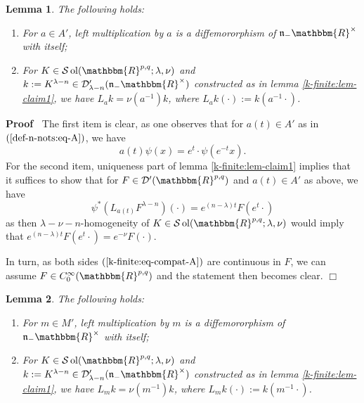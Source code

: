 \documentclass{article}
\newcommand{\assign}{:=}
\newcommand{\tmop}[1]{\ensuremath{\operatorname{#1}}}
\newenvironment{proof}{\noindent\textbf{Proof\ }}{\hspace*{\fill}$\Box$\medskip}
\numberwithin{definition}{section}
\newtheorem{lemma}{Lemma}
\numberwithin{lemma}{section}
\numberwithin{proposition}{section}
{\theorembodyfont{\rmfamily}\newtheorem{remark}{Remark}
\numberwithin{remark}{section}
}
\begin{document}
\begin{lemma}
  \label{k-finite:lem-compat-A}The following holds:
  \begin{enumerate}
    \item For $a \in A'$, left multiplication by $a$ is a diffemororphism of
    $\mathfrak{n}_- \mathbbm{R}^{\times}$ with itself;
    
    \item For $K \in \mathcal{S} \tmop{ol} ( \mathbbm{R}^{p, q} ; \lambda,
    \nu)$ and $k \assign K^{\lambda - n} \in \mathcal{D}'_{\lambda - n} (
    \mathfrak{n}_- \mathbbm{R}^{\times})$ constructed as in lemma
    \ref{k-finite:lem-claim1}, we have $L_a k = \nu ( a^{- 1}) k$, where $L_a
    k ( \cdot) \assign k ( a^{- 1} \cdot)$.
  \end{enumerate}
\end{lemma}

\begin{proof}
  The first item is clear, as one observes that for $a ( t) \in A'$ as in $(
  \ref{def-n-nots:eq-A})$, we have
  \[ a ( t) \psi ( x) = e^t \cdot \psi ( e^{- t} x) . \]
  For the second item, uniqueness part of lemma \ref{k-finite:lem-claim1}
  implies that it suffices to show that for $F \in \mathcal{D}' (
  \mathbbm{R}^{p, q})$ and $a ( t) \in A'$ as above, we have
  \begin{equation}
    \psi^{\ast} ( L_{a ( t)} F^{\lambda - n}) ( \cdot) = e^{( n - \lambda) t}
    F ( e^t \cdot) \label{k-finite:eq-compat-A}
  \end{equation}
  as then $\lambda - \nu - n$-homogeneity of $K \in \mathcal{S} \tmop{ol} (
  \mathbbm{R}^{p, q} ; \lambda, \nu)$ would imply that $e^{( n - \lambda) t} F
  ( e^t \cdot) = e^{- \nu} F ( \cdot)$.
  
  In turn, as both sides $( \ref{k-finite:eq-compat-A})$ are continuous in
  $F$, we can assume $F \in C^{\infty}_0 ( \mathbbm{R}^{p, q})$ and the
  statement then becomes clear.
\end{proof}

\begin{lemma}
  \label{k-finite:lem-compat-M}The following holds:
  \begin{enumerate}
    \item For $m \in M'$, left multiplication by $m$ is a diffemororphism of
    $\mathfrak{n}_- \mathbbm{R}^{\times}$ with itself;
    
    \item For $K \in \mathcal{S} \tmop{ol} ( \mathbbm{R}^{p, q} ; \lambda,
    \nu)$ and $k \assign K^{\lambda - n} \in \mathcal{D}'_{\lambda - n} (
    \mathfrak{n}_- \mathbbm{R}^{\times})$ constructed as in lemma
    \ref{k-finite:lem-claim1}, we have $L_m k = \nu ( m^{- 1}) k$, where $L_m
    k ( \cdot) \assign k ( m^{- 1} \cdot)$.
  \end{enumerate}
\end{lemma}
\end{document}
